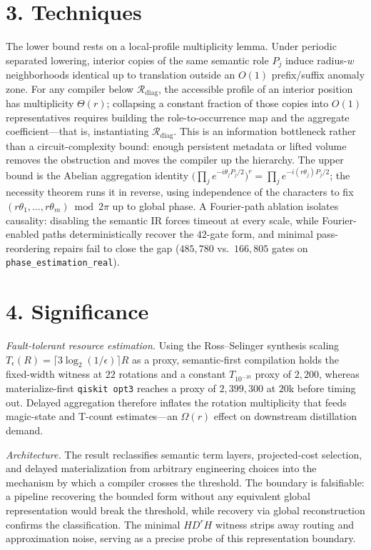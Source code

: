 \documentclass[11pt]{article}
\begin{document}
\section*{3. Techniques}

The lower bound rests on a local-profile multiplicity lemma. Under periodic separated lowering,
interior copies of the same semantic role $P_j$ induce radius-$w$ neighborhoods identical up to
translation outside an $O(1)$ prefix/suffix anomaly zone. For any compiler below
$\mathcal{R}_{\mathrm{diag}}$, the accessible profile of an interior position has multiplicity
$\Theta(r)$; collapsing a constant fraction of those copies into $O(1)$ representatives requires
building the role-to-occurrence map and the aggregate coefficient---that is, instantiating
$\mathcal{R}_{\mathrm{diag}}$. This is an information bottleneck rather than a circuit-complexity
bound: enough persistent metadata or lifted volume removes the obstruction and moves the compiler up
the hierarchy. The upper bound is the Abelian aggregation identity
$\big(\prod_j e^{-i\theta_jP_j/2}\big)^r=\prod_j e^{-i(r\theta_j)P_j/2}$; the necessity theorem runs
it in reverse, using independence of the characters to fix $(r\theta_1,\dots,r\theta_m)\bmod2\pi$ up
to global phase. A Fourier-path ablation isolates causality: disabling the semantic IR forces
timeout at every scale, while Fourier-enabled paths deterministically recover the $42$-gate form,
and minimal pass-reordering repairs fail to close the gap ($485{,}780$ vs.\ $166{,}805$ gates on
\texttt{phase\_estimation\_real}).

\section*{4. Significance}

\noindent\emph{Fault-tolerant resource estimation.} Using the Ross--Selinger synthesis scaling
$T_\epsilon(R)=\lceil 3\log_2(1/\epsilon)\rceil R$ as a proxy, semantic-first compilation holds the
fixed-width witness at $22$ rotations and a constant $T_{10^{-10}}$ proxy of $2{,}200$, whereas
materialize-first \texttt{qiskit opt3} reaches a proxy of $2{,}399{,}300$ at $20$k before timing out.
Delayed aggregation therefore inflates the rotation multiplicity that feeds magic-state and T-count
estimates---an $\Omega(r)$ effect on downstream distillation demand.

\noindent\emph{Architecture.} The result reclassifies semantic term layers, projected-cost selection,
and delayed materialization from arbitrary engineering choices into the mechanism by which a compiler
crosses the threshold. The boundary is falsifiable: a pipeline recovering the bounded form without
any equivalent global representation would break the threshold, while recovery via global
reconstruction confirms the classification. The minimal $HD^rH$ witness strips away routing and
approximation noise, serving as a precise probe of this representation boundary.
\end{document}
